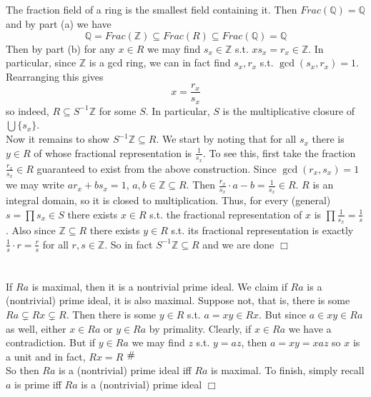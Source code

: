 \documentclass{article}
\newcommand{\contra}{\raisebox{\depth}{\#}}
\begin{document}
\subsection{}
The fraction field of a ring is the smallest field containing it. Then $Frac(\mathbb{Q}) = \mathbb{Q}$ and by part (a) we have
$$\mathbb{Q} = Frac(\mathbb{Z}) \subseteq Frac(R) \subseteq Frac(\mathbb{Q}) = \mathbb{Q} $$
Then by part (b) for any $x \in R$ we may find $s_x \in \mathbb{Z}$ s.t. $xs_x = r_x \in \mathbb{Z}$. In particular, since $\mathbb{Z}$ is a gcd ring, we can in fact find $s_x,r_x$ s.t. $\gcd(s_x,r_x) = 1$. Rearranging this gives
$$x = \frac{r_x}{s_x}$$
so indeed, $R \subseteq S^{-1}\mathbb{Z}$ for some $S$. In particular, $S$ is the multiplicative closure of $\bigcup \{s_x\}$.\\
Now it remains to show $S^{-1}\mathbb{Z} \subseteq R$. We start by noting that for all $s_x$ there is $y \in R$ of whose fractional representation is $\frac{1}{s_x}$. To see this, first take the fraction $\frac{r_x}{s_x} \in R$ guaranteed to exist from the above construction. Since $\gcd(r_x,s_x) = 1$ we may write $ar_x + bs_x = 1$, $a,b \in \mathbb{Z} \subseteq R$. Then $\frac{r_x}{s_x} \cdot a - b = \frac{1}{s_x} \in R$. $R$ is an integral domain, so it is closed to multiplication. Thus, for every (general) $s = \prod s_x \in S$ there exists $x \in R$ s.t. the fractional representation of $x$ is $\prod\frac{1}{s_x} = \frac{1}{s}$. Also since $\mathbb{Z} \subseteq R$ there exists $y \in R$ s.t. its fractional representation is exactly $\frac{1}{s} \cdot r = \frac{r}{s}$ for all $r,s \in \mathbb{Z}$. So in fact $S^{-1}\mathbb{Z} \subseteq R$ and we are done $\Box$

\section{}
\subsection{}
If $Ra$ is maximal, then it is a nontrivial prime ideal. We claim if $Ra$ is a (nontrivial) prime ideal, it is also maximal. Suppose not, that is, there is some $Ra \subsetneq Rx \subsetneq R$. Then there is some $y \in R$ s.t. $a = xy \in Rx$. But since $a \in xy \in Ra$ as well, either $x \in Ra$ or $y \in Ra$ by primality. Clearly, if $x \in Ra$ we have a contradiction. But if $y \in Ra$ we may find $z$ s.t. $y = az$, then $a = xy = xaz$ so $x$ is a unit and in fact, $Rx = R$ $\contra$\\
So then $Ra$ is a (nontrivial) prime ideal iff $Ra$ is maximal. To finish, simply recall $a$ is prime iff $Ra$ is a (nontrivial) prime ideal $\Box$
\end{document}
